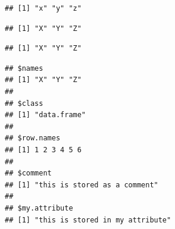 \documentclass[krantz2]{krantz}\usepackage{knitr}
\begin{document}
\begin{knitrout}\footnotesize
{}\color{fgcolor}\begin{kframe}
\begin{alltt}
\end{alltt}
\begin{verbatim}
## [1] "x" "y" "z"
\end{verbatim}
\begin{alltt}
 \hlkwb{<-} \hlstd{(}
\end{alltt}
\begin{verbatim}
## [1] "X" "Y" "Z"
\end{verbatim}
\begin{alltt}
 \hlstd{)} 
\end{alltt}
\begin{verbatim}
## [1] "X" "Y" "Z"
\end{verbatim}
\begin{alltt}
 \hlstd{)} \hlkwb{<-} 
\end{alltt}
\begin{verbatim}
## $names
## [1] "X" "Y" "Z"
## 
## $class
## [1] "data.frame"
## 
## $row.names
## [1] 1 2 3 4 5 6
## 
## $comment
## [1] "this is stored as a comment"
## 
## $my.attribute
## [1] "this is stored in my attribute"
\end{verbatim}
\end{kframe}
\end{knitrout}
\end{document}
